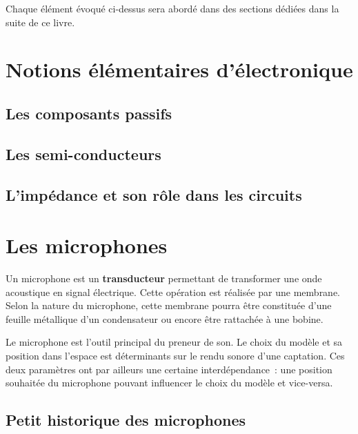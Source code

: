 \documentclass[
]{book}
\begin{document}
Chaque élément évoqué ci-dessus sera abordé dans des sections dédiées dans la suite de ce livre.

\hypertarget{notions-uxe9luxe9mentaires-duxe9lectronique}{%
\chapter{Notions élémentaires d'électronique}\label{notions-uxe9luxe9mentaires-duxe9lectronique}}

\hypertarget{les-composants-passifs}{%
\section{Les composants passifs}\label{les-composants-passifs}}

\hypertarget{les-semi-conducteurs}{%
\section{Les semi-conducteurs}\label{les-semi-conducteurs}}

\hypertarget{limpuxe9dance-et-son-ruxf4le-dans-les-circuits}{%
\section{L'impédance et son rôle dans les circuits}\label{limpuxe9dance-et-son-ruxf4le-dans-les-circuits}}

\hypertarget{les-microphones}{%
\chapter{Les microphones}\label{les-microphones}}

Un microphone est un \textbf{transducteur} permettant de transformer une onde acoustique en signal électrique. Cette opération est réalisée par une membrane. Selon la nature du microphone, cette membrane pourra être constituée d'une feuille métallique d'un condensateur ou encore être rattachée à une bobine.

Le microphone est l'outil principal du preneur de son. Le choix du modèle et sa position dans l'espace est déterminants sur le rendu sonore d'une captation. Ces deux paramètres ont par ailleurs une certaine interdépendance~: une position souhaitée du microphone pouvant influencer le choix du modèle et vice-versa.

\hypertarget{petit-historique-des-microphones}{%
\section{Petit historique des microphones}\label{petit-historique-des-microphones}}
\end{document}
